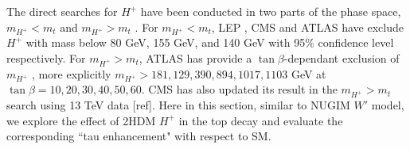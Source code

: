 
The direct searches for $H^+$ have been conducted in two parts of the phase space, $m_{H^+} < m_t$  and $m_{H^+} > m_t$ \cite{pdg2020}. For $m_{H^+} < m_t$, LEP \cite{Abbiendi:2013hk}, CMS \cite{Khachatryan:2015qxa} and ATLAS \cite{Aad:2014kga} have exclude $H^+$ with mass below 80 GeV, 155 GeV, and 140 GeV with 95\% confidence level respectively. For $m_{H^+} > m_t$, ATLAS has provide a $\tan\beta$-dependant exclusion of $m_{H^+}$ \cite{Aaboud:2018gjj}, more explicitly $m_{H^+}>181,129,390,894,1017,1103$ GeV at $\tan\beta=10,20,30,40,50,60$. CMS has also updated its result in the $m_{H^+} > m_t$ search using 13 TeV data [ref]. Here in this section, similar to NUGIM $W'$ model, we explore the effect of 2HDM $H^+$ in the top decay and evaluate the corresponding ``tau enhancement" with respect to SM.






